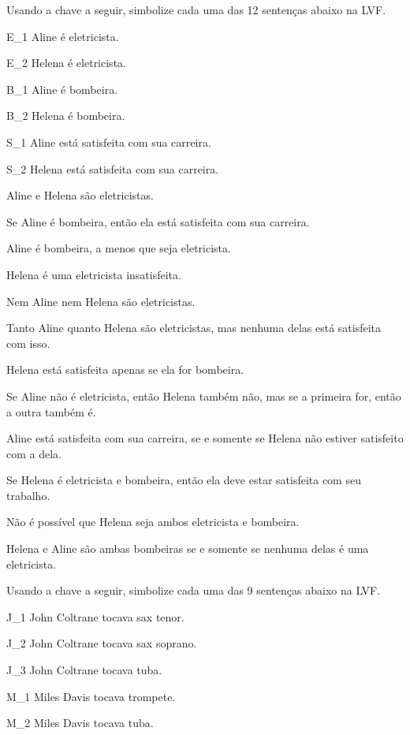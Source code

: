 \problempart Usando a chave a seguir, simbolize cada uma das 12 sentenças abaixo na LVF.\label{pr.avacareer}
	\begin{ekey}
		\item[E_1] Aline é eletricista.
		\item[E_2] Helena é eletricista.
		\item[B_1] Aline é bombeira.
		\item[B_2] Helena é bombeira.
		\item[S_1] Aline está satisfeita com sua carreira.
		\item[S_2] Helena está satisfeita com sua carreira.
	\end{ekey}
	\begin{earg}
		\item Aline e Helena são eletricistas.
		\item Se Aline é bombeira, então ela está satisfeita com sua carreira.
		\item Aline é bombeira, a menos que seja eletricista.
		\item Helena é uma eletricista insatisfeita.
		\item Nem Aline nem Helena são eletricistas.
		\item Tanto Aline quanto Helena são eletricistas, mas nenhuma delas está satisfeita com isso.
		\item Helena está satisfeita apenas se ela for bombeira.
		\item Se Aline não é eletricista, então Helena também não, mas se a primeira for, então a outra também é.
		\item Aline está satisfeita com sua carreira, se e somente se Helena não estiver satisfeito com a dela.
		\item Se Helena é eletricista e bombeira, então ela deve estar satisfeita com seu trabalho.
		\item Não é possível que Helena seja ambos eletricista e bombeira.
		\item Helena e Aline são ambas bombeiras se e somente se nenhuma delas é uma eletricista.
	\end{earg}

\problempart
Usando a chave a seguir, simbolize cada uma das 9 sentenças abaixo na LVF.
\label{pr.jazzinstruments}
\begin{ekey}
	\item[J_1] John Coltrane tocava sax tenor.
	\item[J_2] John Coltrane tocava sax soprano.
	\item[J_3] John Coltrane tocava tuba.
	\item[M_1] Miles Davis tocava trompete.
	\item[M_2] Miles Davis tocava tuba.
\end{ekey}

